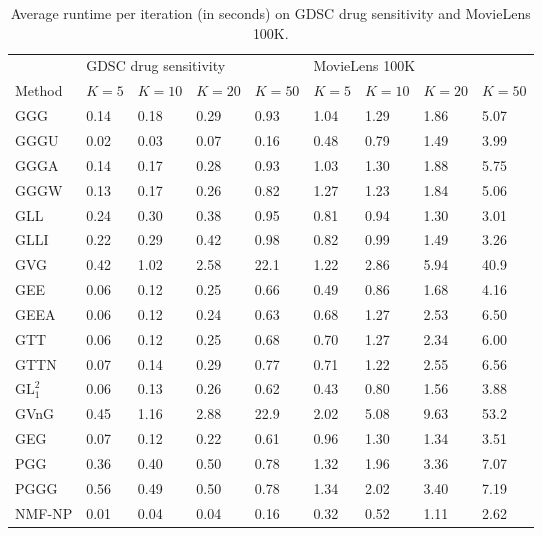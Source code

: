 \documentclass{article}
\begin{document}
		\begin{table*}[h]
			\caption{Average runtime per iteration (in seconds) on GDSC drug sensitivity and MovieLens 100K.} 
			\label{runtimes_table}
			\centering
			\begin{tabular}{lllllllll}
				\toprule
				& \multicolumn{4}{l}{GDSC drug sensitivity} & \multicolumn{4}{l}{MovieLens 100K} \\
				\cmidrule(r){2-5} \cmidrule{6-9}
				Method & $K=5 $ & $K=10 $ & $K=20 $ & $K=50 $ & $K=5 $ & $K=10 $ & $K=20 $ & $K=50 $ \\
				\cmidrule(r){1-1} \cmidrule(r){2-2} \cmidrule(r){3-3} \cmidrule(r){4-4} \cmidrule(r){5-5} \cmidrule(r){6-6} \cmidrule(r){7-7} \cmidrule(r){8-8} \cmidrule{9-9}
				GGG & 0.14 & 0.18 & 0.29 & 0.93 & 1.04 & 1.29 & 1.86 & 5.07 \\
				GGGU & 0.02 & 0.03 & 0.07 & 0.16 & 0.48 & 0.79 & 1.49 & 3.99 \\
				GGGA & 0.14 & 0.17 & 0.28 & 0.93 & 1.03 & 1.30 & 1.88 & 5.75 \\
				GGGW & 0.13 & 0.17 & 0.26 & 0.82 & 1.27 & 1.23 & 1.84 & 5.06 \\
				GLL & 0.24 & 0.30 & 0.38 & 0.95 & 0.81 & 0.94 & 1.30 & 3.01 \\
				GLLI & 0.22 & 0.29 & 0.42 & 0.98 & 0.82 & 0.99 & 1.49 & 3.26 \\ 
				GVG & 0.42 & 1.02 & 2.58 & 22.1 & 1.22 & 2.86 & 5.94 & 40.9 \\
				\midrule
				GEE & 0.06 & 0.12 & 0.25 & 0.66 & 0.49 & 0.86 & 1.68 & 4.16 \\
				GEEA & 0.06 & 0.12 & 0.24 & 0.63 & 0.68 & 1.27 & 2.53 & 6.50 \\
				GTT & 0.06 & 0.12 & 0.25 & 0.68 & 0.70 & 1.27 & 2.34 & 6.00 \\
				GTTN & 0.07 & 0.14 & 0.29 & 0.77 & 0.71 & 1.22 & 2.55 & 6.56 \\
				$\text{GL}^2_1$ & 0.06 & 0.13 & 0.26 & 0.62 & 0.43 & 0.80 & 1.56 & 3.88 \\
				\midrule
				GVnG & 0.45 & 1.16 & 2.88 & 22.9 & 2.02 & 5.08 & 9.63 & 53.2 \\
				GEG & 0.07 & 0.12 & 0.22 & 0.61 & 0.96 & 1.30 & 1.34 & 3.51 \\
				\midrule
				PGG & 0.36 & 0.40 & 0.50 & 0.78 & 1.32 & 1.96 & 3.36 & 7.07 \\
				PGGG & 0.56 & 0.49 & 0.50 & 0.78 & 1.34 & 2.02 & 3.40 & 7.19 \\
				\midrule
				NMF-NP & 0.01 & 0.04 & 0.04 & 0.16 & 0.32 & 0.52 & 1.11 & 2.62 \\
				\bottomrule
			\end{tabular}
		\end{table*}
		
\end{document}
